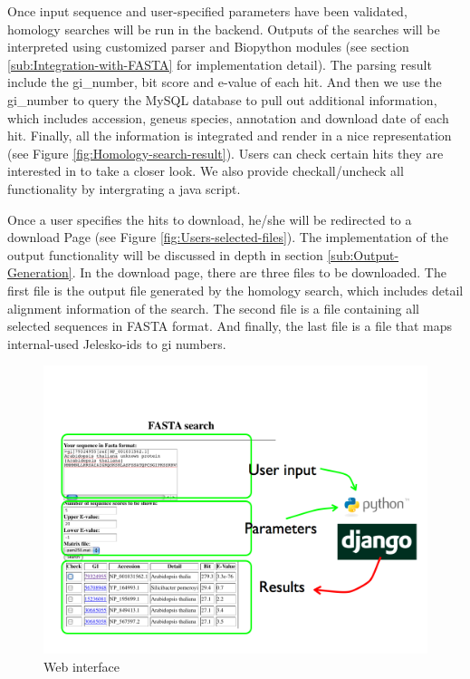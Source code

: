 \documentclass[11pt,letterpaper,twoside,english]{article}
\begin{document}
Once input sequence and user-specified parameters have been validated,
homology searches will be run in the backend. Outputs of the searches
will be interpreted using customized parser and Biopython modules
(see section \ref{sub:Integration-with-FASTA} for implementation
detail). The parsing result include the gi\_number, bit score and
e-value of each hit. And then we use the gi\_number to query the MySQL
database to pull out additional information, which includes accession,
geneus species, annotation and download date of each hit. Finally,
all the information is integrated and render in a nice representation
(see Figure \ref{fig:Homology-search-result}). Users can check certain
hits they are interested in to take a closer look. We also provide
checkall/uncheck all functionality by intergrating a java script.

Once a user specifies the hits to download, he/she will be redirected
to a download Page (see Figure \ref{fig:Users-selected-files}). The
implementation of the output functionality will be discussed in depth
in section \ref{sub:Output-Generation}. In the download page, there
are three files to be downloaded. The first file is the output file
generated by the homology search, which includes detail alignment
information of the search. The second file is a file containing all
selected sequences in FASTA format. And finally, the last file is
a file that maps internal-used Jelesko-ids to gi numbers.

%
\begin{figure}[h]
\begin{centering}
\includegraphics[width=1\linewidth]{figures/web_interface}
\par\end{centering}

\caption{\label{fig:Web-interface}Web interface}

\end{figure}
\end{document}
